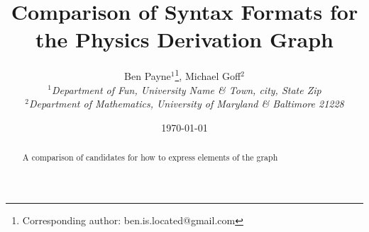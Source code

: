 \documentclass{article}
\begin{document}
\title{Comparison of Syntax Formats for the Physics Derivation Graph}

\author{Ben Payne$^{1}$\footnote{Corresponding author: ben.is.located@gmail.com}, Michael Goff$^{2}$\\
{\it $^{1}$Department of Fun, University Name \& Town, city, State Zip}\\
{\it $^{2}$Department of Mathematics, University of Maryland \& Baltimore 21228}}

\date{\today}


\maketitle %

\begin{abstract}
A comparison of candidates for how to express elements of the graph
\end{abstract}
\end{document}
